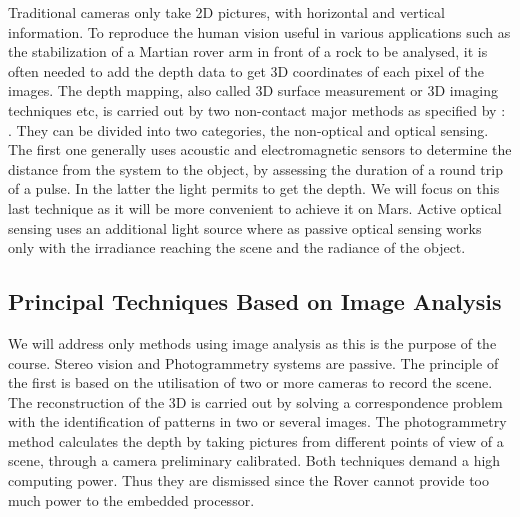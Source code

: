 Traditional cameras only take 2D pictures, with horizontal and vertical information. To reproduce the human vision useful in various applications such as the stabilization of a Martian rover arm in front of a rock to be analysed, it is often needed to add the depth data to get 3D coordinates of each pixel of the images. The depth mapping, also called 3D surface measurement or 3D imaging techniques etc, is carried out by two non-contact major methods as specified by \cite{sansoni2009state}: . They can be divided into two categories, the non-optical and optical sensing. The first one generally uses acoustic and electromagnetic sensors to determine the distance from the system to the object, by assessing the duration of a round trip of a pulse. In the latter the light permits to get the depth. We will focus on this last technique as it will be more convenient to achieve it on Mars. Active optical sensing uses an additional light source where as passive optical sensing works only with the irradiance reaching the scene and the radiance of the object. 

\subsection{Principal Techniques Based on Image Analysis}
We will address only methods using image analysis as this is the purpose of the course.
Stereo vision and Photogrammetry systems are passive. The principle of the first is based on the utilisation of two or more cameras to record the scene. The reconstruction of the 3D is carried out by solving a correspondence problem with the identification of patterns in two or several images. The photogrammetry method calculates the depth by taking pictures from different points of view of a scene, through a camera preliminary calibrated. Both techniques demand a high computing power. Thus they are dismissed since the Rover cannot provide too much power to the embedded processor. 

